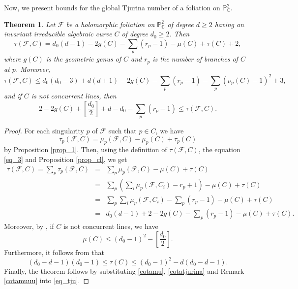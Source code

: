 \documentclass[11pt]{amsart}
\newcommand{\C}{\mathbb{C}}
\newcommand{\F}{\mathcal{F}}
\newtheorem{theorem}{Theorem}[section]
\begin{document}
\par Now, we present bounds for the global Tjurina number of a foliation on $\mathbb{P}^2_\C$.
\begin{theorem}\label{tjurina}
Let $\F$ be a holomorphic foliation on $\mathbb{P}_{\C}^2$ of degree $d\geq 2$ having an invariant irreducible algebraic curve $C$ of degree $d_0\geq 2$. Then
\[\tau(\mathcal{F},C)=d_0(d-1)-2g(C)-\sum_p(r_p-1)-\mu(C)+\tau(C)+2,\]
where $g(C)$ is the geometric genus of $C$ and $r_p$ is the number of branches of $C$ at $p$.
Moreover, 
\[\tau(\mathcal{F},C) \leq d_0(d_0-3)+d(d+1)-2g(C)-\sum_p(r_p-1) - \sum_p (\nu_p(C)-1)^{2}+3,\] 
and if $C$ is not concurrent lines, then 
\[2-2g(C)+ \left[\frac{d_0}{2}\right]+d-d_0-\sum_p(r_p-1) \leq \tau(\mathcal{F},C).\]
\end{theorem}
\begin{proof}
For each singularity $p$ of $\F$ such that $p\in C$, we have 
\begin{equation*}
    \tau_p(\mathcal{F},C)=\mu_p(\mathcal{F},C)-\mu_p(C)+\tau_p(C)
\end{equation*}
by Proposition \ref{prop_1}. Then, using the definition of $\tau(\F,C)$, the equation \eqref{eq_3} and Proposition \ref{prop_cl}, we get
\begin{eqnarray}
   \tau(\mathcal{F},C)=\sum_p \tau_p(\mathcal{F},C)&=&\sum_p\mu_p(\mathcal{F},C)-\mu(C)+\tau(C)\nonumber\\
   &=& \sum_p\left(\sum_i\mu_p(\F,C_i)-r_p+1\right)-\mu(C)+\tau(C)\nonumber\\
   &=&  \sum_p\sum_i\mu_p(\F,C_i)-\sum_p(r_p-1)-\mu(C)+\tau(C)\nonumber\\
   &=&d_{0}(d-1)+2-2g(C)-\sum_p(r_p-1)-\mu(C)+\tau(C).\label{eq_tju}
\end{eqnarray}
 Moreover, by \cite[Corollary 3.4]{Shin}, if $C$ is not concurrent lines, we have
\begin{equation}\label{cotamu}
\mu(C)\leq (d_0-1)^{2}-\left[\frac{d_0}{2}\right].
\end{equation} 
Furthermore, it follows from \cite[Theorem 3.2]{plessis} that
\begin{equation}\label{cotatjurina}
(d_0-d-1)(d_0-1) \leq \tau(C) \leq (d_0-1)^{2} -d(d_0 -d-1).
\end{equation}
Finally, the theorem follows by substituting \eqref{cotamu}, \eqref{cotatjurina} and Remark \ref{cotamuuu} into \eqref{eq_tju}.
\end{proof}
\end{document}
